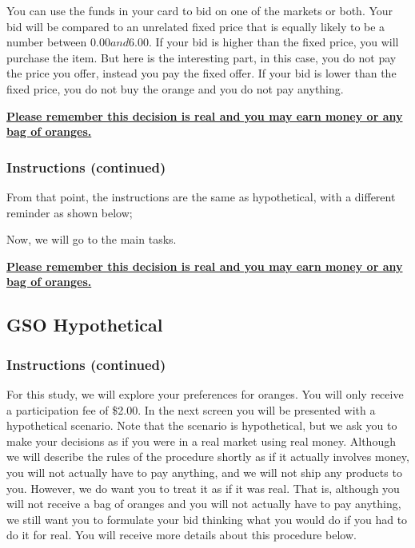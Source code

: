 \documentclass[12pt]{article}
\begin{document}
{You can use the funds in your card to bid on one of the markets or both. Your bid will be compared to an unrelated fixed price that is equally likely to be a number between $0.00 and $6.00. If your bid is higher than the fixed price, you will purchase the item. But here is the interesting part, in this case, you do not pay the price you offer, instead you pay the fixed offer. If your bid is lower than the fixed price, you do not buy the orange and you do not pay anything. 

 

\textbf{ \underline{Please remember this decision is real and you may earn money or any bag of oranges.}}

 

 \clearpage

\subsubsection*{\textbf{Instructions (continued)}}

From that point, the instructions are the same as hypothetical, with a different reminder as shown below;

 Now, we will go to the main tasks.


\textbf{ \underline{Please remember this decision is real and you may earn money or any bag of oranges.}}

 \clearpage

 \subsection{GSO Hypothetical}
 \subsubsection*{\textbf{Instructions (continued)}}

For this study, we will explore your preferences for oranges. You will only receive a participation fee of \$2.00. In the next screen you will be presented with a hypothetical scenario. Note that the scenario is hypothetical, but we ask you to make your decisions as if you were in a real market using real money. Although we will describe the rules of the procedure shortly as if it actually involves money, you will not actually have to pay anything, and we will not ship any products to you. However, we do want you to treat it as if it was real. That is, although you will not receive a bag of oranges and you will not actually have to pay anything, we still want you to formulate your bid thinking what you would do if you had to do it for real. You will receive more details about this procedure below.


}
\end{document}
